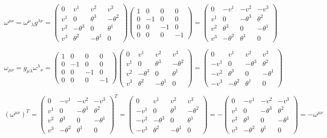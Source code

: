 \documentclass{article}
\begin{document}
\[\omega^{\mu\nu}={\omega^\mu}_\lambda g^{\lambda\nu}=\begin{pmatrix}0&v^1&v^2&v^3\\v^1&0&\theta^3&-\theta^2\\v^2&-\theta^3&0&\theta^1\\v^3&\theta^2&-\theta^1&0\end{pmatrix}
	\begin{pmatrix}1&0&0&0\\0&-1&0&0\\0&0&-1&0\\0&0&0&-1\end{pmatrix}=
	\begin{pmatrix}0&-v^1&-v^2&-v^3\\v^1&0&-\theta^3&\theta^2\\v^2&\theta^3&0&-\theta^1\\v^3&-\theta^2&\theta^1&0\end{pmatrix}\]

\[\omega_{\mu\nu}=g_{\mu\lambda}{\omega^\lambda}_\nu =\begin{pmatrix}1&0&0&0\\0&-1&0&0\\0&0&-1&0\\0&0&0&-1\end{pmatrix}
	\begin{pmatrix}0&v^1&v^2&v^3\\v^1&0&\theta^3&-\theta^2\\v^2&-\theta^3&0&\theta^1\\v^3&\theta^2&-\theta^1&0\end{pmatrix}=
	\begin{pmatrix}0&v^1&v^2&v^3\\-v^1&0&-\theta^3&\theta^2\\-v^2&\theta^3&0&-\theta^1\\-v^3&-\theta^2&\theta^1&0\end{pmatrix}\]

\[(\omega^{\mu\nu})^T=\begin{pmatrix}0&-v^1&-v^2&-v^3\\v^1&0&-\theta^3&\theta^2\\v^2&\theta^3&0&-\theta^1\\v^3&-\theta^2&\theta^1&0\end{pmatrix}^T=\begin{pmatrix}0&v^1&v^2&v^3\\-v^1&0&\theta^3&-\theta^2\\-v^2&-\theta^3&0&\theta^1\\-v^3&\theta^2&-\theta^1&0\end{pmatrix}=-\begin{pmatrix}0&-v^1&-v^2&-v^3\\v^1&0&-\theta^3&\theta^2\\v^2&\theta^3&0&-\theta^1\\v^3&-\theta^2&\theta^1&0\end{pmatrix}=-\omega^{\mu\nu}\]
\end{document}
